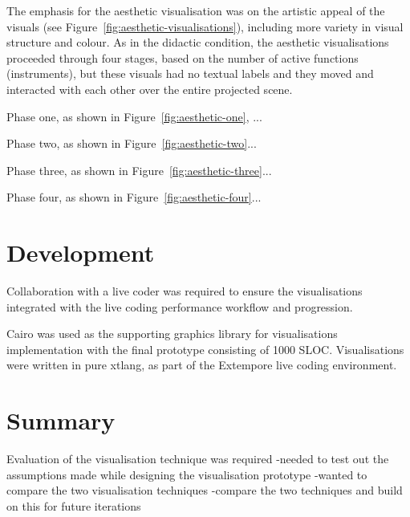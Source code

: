 The emphasis for the aesthetic visualisation was on the artistic appeal of the visuals (see Figure~\ref{fig:aesthetic-visualisations}), including more variety in visual structure and colour. As in the didactic condition, the aesthetic visualisations proceeded through four stages, based on the number of active functions (instruments), but these visuals had no textual labels and they moved and interacted with each other over the entire projected scene.



Phase one, as shown in Figure~\ref{fig:aesthetic-one}, ...

Phase two, as shown in Figure~\ref{fig:aesthetic-two}...

Phase three, as shown in Figure~\ref{fig:aesthetic-three}...

Phase four, as shown in Figure~\ref{fig:aesthetic-four}...

\section{Development}

Collaboration with a live coder was required to ensure the visualisations integrated with the live coding performance workflow and progression.

Cairo was used as the supporting graphics library for visualisations implementation with the final prototype consisting of 1000 \ac{SLOC}. Visualisations were written in pure xtlang, as part of the Extempore live coding environment.


\section{Summary}

Evaluation of the visualisation technique was required 
-needed to test out the assumptions made while designing the visualisation prototype
-wanted to compare the two visualisation techniques
-compare the two techniques and build on this for future iterations



